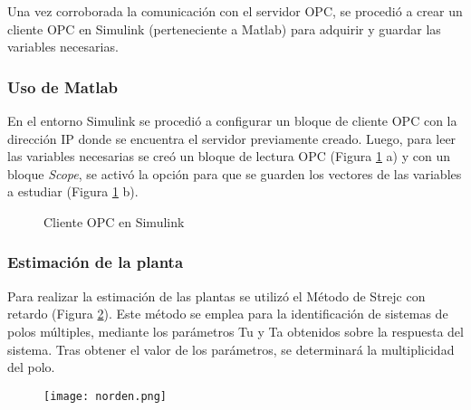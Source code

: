 Una vez corroborada la comunicación con el servidor OPC, se procedió a crear un cliente OPC en Simulink (perteneciente a Matlab) para adquirir y guardar las variables necesarias. 


\subsubsection{Uso de Matlab}
En el entorno Simulink se procedió a configurar un bloque de cliente OPC con la dirección IP donde se encuentra el servidor previamente creado. Luego, para leer las variables necesarias se creó un bloque de lectura OPC (Figura \ref{fig:opcsimu} a) y con un bloque \textit{Scope}, se activó la opción para que se guarden los vectores de las variables a estudiar (Figura \ref{fig:opcsimu} b). 


\begin{figure}[htbp]
	\centering
	\caption{Cliente OPC en Simulink} \label{fig:opcsimu}
\end{figure}



\subsubsection{Estimación de la planta}
Para realizar la estimación de las plantas se utilizó el Método de Strejc con retardo (Figura \ref{fig:norden})\cite{pomares2011sistemas}.
Este método se emplea para la identificación de sistemas de polos múltiples,
mediante los parámetros Tu y Ta obtenidos sobre la respuesta del sistema.
Tras obtener el valor de los parámetros, se determinará la multiplicidad del polo. 
\begin{figure}[htb]
	\centering
	\texttt{[image: norden.png]}
	\label{fig:norden}
\end{figure}

